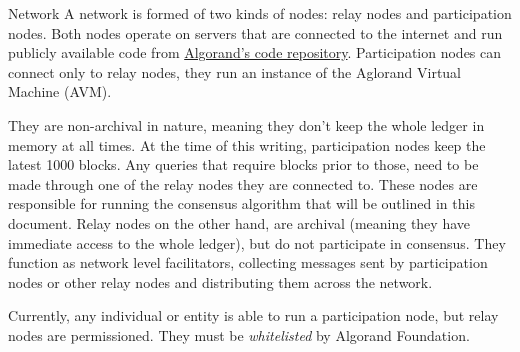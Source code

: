 \documentclass[10pt,a4paper]{article}
\begin{document}
\begin{section}{Network}
A network is formed of two kinds of nodes: {\sf relay nodes}
and {\sf participation nodes}. 
Both nodes operate on servers that are connected to the internet and run publicly
available code from \href{https://github.com/algorand/go-algorand}{Algorand's code repository}.
Participation nodes can connect only to relay nodes, they run an instance
of the Aglorand Virtual Machine (AVM).


They are non-archival in nature, meaning they don't keep
the whole ledger in memory at all times. At the time of this writing,
participation nodes keep the latest 1000 blocks.
Any queries that require blocks prior to those, need to be made
through one of the relay nodes they are connected to.
These nodes are responsible for running the consensus algorithm that
will be outlined in this document.
Relay nodes on the other hand, are archival (meaning they have immediate
access to the whole ledger), but do not participate in consensus.
They function as network level facilitators, collecting messages sent by participation
nodes or other relay nodes and distributing them across the network.

Currently, any individual or entity is able to run a participation node, 
but relay nodes are permissioned. They must be {\em whitelisted} by Algorand Foundation.


\end{section}
\end{document}
